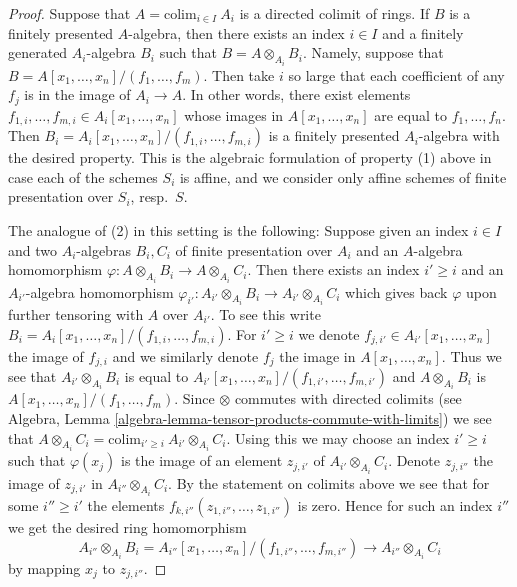 \begin{proof}
Suppose that $A = \text{colim}_{i \in I}\ A_i$ is a directed
colimit of rings. If $B$ is a finitely presented $A$-algebra,
then there exists an index $i \in I$ and a finitely generated
$A_i$-algebra $B_i$ such that $B = A \otimes_{A_i} B_i$. Namely,
suppose that $B = A[x_1, \ldots, x_n]/(f_1, \ldots, f_m)$.
Then take $i$ so large that each coefficient of any $f_j$ is
in the image of $A_i \to A$. In other words, there exist
elements $f_{1, i}, \ldots, f_{m, i} \in A_i[x_1, \ldots, x_n]$
whose images in $A[x_1, \ldots, x_n]$ are equal to $f_1, \ldots, f_n$.
Then $B_i = A_i[x_1, \ldots, x_n]/(f_{1, i}, \ldots, f_{m, i})$
is a finitely presented $A_i$-algebra with the desired property.
This is the algebraic formulation of property (1) above
in case each of the schemes $S_i$ is affine, and we consider
only affine schemes of finite presentation over $S_i$, resp.\ $S$.

\medskip\noindent
The analogue of (2) in this setting is the following:
Suppose given an index $i \in I$ and two $A_i$-algebras
$B_i, C_i$ of finite presentation over $A_i$ and an $A$-algebra
homomorphism $\varphi : A \otimes_{A_i} B_i \to A \otimes_{A_i} C_i$.
Then there exists an index $i' \geq i$ and an $A_{i'}$-algebra
homomorphism
$\varphi_{i'} : A_{i'} \otimes_{A_i} B_i \to A_{i'} \otimes_{A_i} C_i$
which gives back $\varphi$ upon further tensoring with $A$ over $A_{i'}$.
To see this write $B_i = A_i[x_1, \ldots, x_n]/(f_{1, i}, \ldots, f_{m, i})$.
For $i' \geq i$ we denote $f_{j, i'} \in A_{i'}[x_1, \ldots, x_n]$
the image of $f_{j, i}$ and we similarly denote $f_j$ the image in
$A[x_1, \ldots, x_n]$. Thus we see that
$A_{i'} \otimes_{A_i} B_i$ is equal to
$A_{i'}[x_1, \ldots, x_n]/(f_{1, i'}, \ldots, f_{m, i'})$
and
$A \otimes_{A_i} B_i$ is
$A[x_1, \ldots, x_n]/(f_1, \ldots, f_m)$.
Since $\otimes$ commutes with directed colimits
(see Algebra, Lemma \ref{algebra-lemma-tensor-products-commute-with-limits})
we see that
$A \otimes_{A_i} C_i = \text{colim}_{i' \geq i}\ A_{i'} \otimes_{A_i} C_i$.
Using this we may choose an index $i' \geq i$
such that $\varphi(x_j)$ is the image of an element $z_{j, i'}$
of $A_{i'} \otimes_{A_i} C_i$. Denote $z_{j, i''}$ the image
of $z_{j, i'}$ in $A_{i''} \otimes_{A_i} C_i$. By the statement
on colimits above we see that for some $i'' \geq i'$ the
elements $f_{k, i''}(z_{1, i''}, \ldots, z_{1, i''})$ is zero.
Hence for such an index $i''$ we get the desired ring homomorphism
$$
A_{i''} \otimes_{A_i} B_i =
A_{i''}[x_1, \ldots, x_n]/(f_{1, i''}, \ldots, f_{m, i''})
\longrightarrow
A_{i''} \otimes_{A_i} C_i
$$
by mapping $x_j$ to $z_{j, i''}$.


\end{proof}
